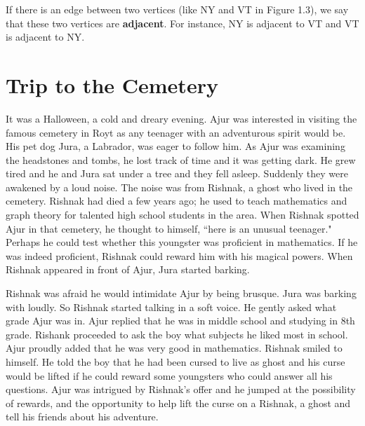If there is an edge between two vertices (like NY and VT in Figure 1.3), we say that these two vertices are \textbf{adjacent}. For instance, NY is adjacent to VT and VT is adjacent to NY.

   

\chapter{Trip to the Cemetery}
It was a Halloween, a cold and dreary evening. Ajur was interested in visiting the famous cemetery in Royt as any teenager with an adventurous spirit would be. His pet dog Jura, a Labrador, was eager to follow him. As Ajur was examining the headstones and tombs, he lost track of time and it was getting dark. He grew tired and he and Jura sat under a tree and they fell asleep. Suddenly they were awakened by a loud noise. The noise was from Rishnak, a ghost who lived in the cemetery. Rishnak had died a few years ago; he used to teach mathematics and graph theory for talented high school students in the area. When Rishnak spotted Ajur in that cemetery, he thought to himself, ``here is an unusual teenager." Perhaps he could test whether this youngster  was proficient in mathematics. If he was indeed proficient, Rishnak could reward him with his magical powers. When Rishnak appeared in front of Ajur, Jura started barking.  

Rishnak was afraid he would intimidate Ajur by being brusque. Jura was barking with loudly. So Rishnak started talking in a soft voice. He gently asked what grade Ajur was in. Ajur replied that he was in middle school and studying in 8th grade. Rishank proceeded to ask the boy what subjects he liked most in school. Ajur proudly added that he was very good in mathematics. Rishnak smiled to himself. He told the boy that he had been cursed to live as ghost and his curse would be lifted if he could reward some youngsters who could answer all his questions. Ajur was intrigued by Rishnak's offer and he jumped at the possibility of rewards, and the opportunity to help lift the curse on a Rishnak, a ghost and tell his friends about his adventure.